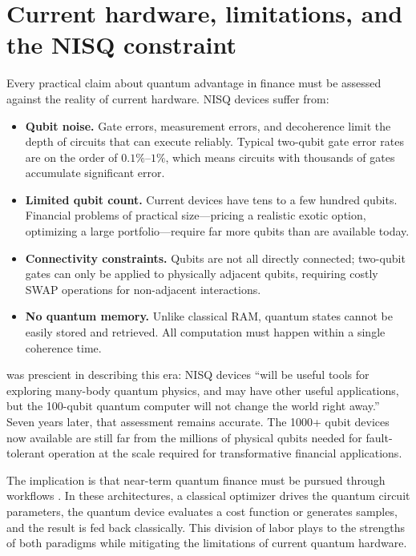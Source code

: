 \section{Current hardware, limitations, and the NISQ constraint}

Every practical claim about quantum advantage in finance must be assessed against the reality of current hardware. NISQ devices suffer from:

\begin{itemize}
\item \textbf{Qubit noise.} Gate errors, measurement errors, and decoherence limit the depth of circuits that can execute reliably. Typical two-qubit gate error rates are on the order of $0.1\%$--$1\%$, which means circuits with thousands of gates accumulate significant error.
\item \textbf{Limited qubit count.} Current devices have tens to a few hundred qubits. Financial problems of practical size---pricing a realistic exotic option, optimizing a large portfolio---require far more qubits than are available today.
\item \textbf{Connectivity constraints.} Qubits are not all directly connected; two-qubit gates can only be applied to physically adjacent qubits, requiring costly SWAP operations for non-adjacent interactions.
\item \textbf{No quantum memory.} Unlike classical RAM, quantum states cannot be easily stored and retrieved. All computation must happen within a single coherence time.
\end{itemize}

\citet{preskill_quantum_2018} was prescient in describing this era: NISQ devices ``will be useful tools for exploring many-body quantum physics, and may have other useful applications, but the 100-qubit quantum computer will not change the world right away.'' Seven years later, that assessment remains accurate. The 1000+ qubit devices now available are still far from the millions of physical qubits needed for fault-tolerant operation at the scale required for transformative financial applications.

The implication is that near-term quantum finance must be pursued through  workflows \citep{morapakula_end--end_2026,gong_quantum_2026-1}. In these architectures, a classical optimizer drives the quantum circuit parameters, the quantum device evaluates a cost function or generates samples, and the result is fed back classically. This division of labor plays to the strengths of both paradigms while mitigating the limitations of current quantum hardware.

